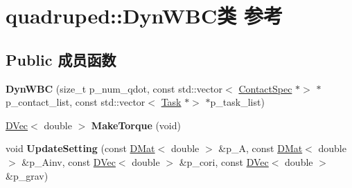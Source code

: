 \hypertarget{classquadruped_1_1DynWBC}{}\section{quadruped\+:\+:Dyn\+W\+B\+C类 参考}
\label{classquadruped_1_1DynWBC}
\subsection*{Public 成员函数}
\begin{DoxyCompactItemize}
\item 
\mbox{\label{classquadruped_1_1DynWBC_a45addb67f275b705bdd91653ed3e3b8d}} 
{\bfseries Dyn\+W\+BC} (size\+\_\+t p\+\_\+num\+\_\+qdot, const std\+::vector$<$ \hyperlink{classquadruped_1_1ContactSpec}{Contact\+Spec} $\ast$$>$ $\ast$p\+\_\+contact\+\_\+list, const std\+::vector$<$ \hyperlink{classquadruped_1_1Task}{Task} $\ast$$>$ $\ast$p\+\_\+task\+\_\+list)
\item 
\mbox{\label{classquadruped_1_1DynWBC_a28c18329b95f92bc3c88dff477902f13}} 
\hyperlink{cppTypes_8h_adad69baca3c77d5f991be5d3c063fea7}{D\+Vec}$<$ double $>$ {\bfseries Make\+Torque} (void)
\item 
\mbox{\label{classquadruped_1_1DynWBC_ab4228b91b88daf062fdde0b21afe69b2}} 
void {\bfseries Update\+Setting} (const \hyperlink{cppTypes_8h_a5db6bfb25afa103db1fb6bb6287ae9d7}{D\+Mat}$<$ double $>$ \&p\+\_\+A, const \hyperlink{cppTypes_8h_a5db6bfb25afa103db1fb6bb6287ae9d7}{D\+Mat}$<$ double $>$ \&p\+\_\+\+Ainv, const \hyperlink{cppTypes_8h_adad69baca3c77d5f991be5d3c063fea7}{D\+Vec}$<$ double $>$ \&p\+\_\+cori, const \hyperlink{cppTypes_8h_adad69baca3c77d5f991be5d3c063fea7}{D\+Vec}$<$ double $>$ \&p\+\_\+grav)
\end{DoxyCompactItemize}
